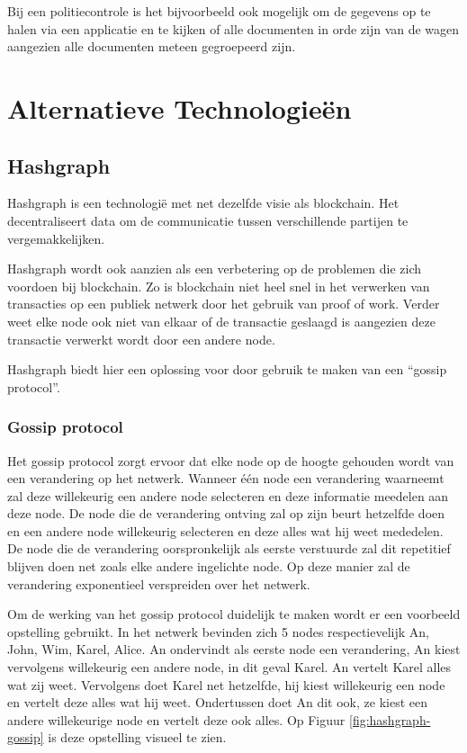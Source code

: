 Bij een politiecontrole is het bijvoorbeeld ook mogelijk om de gegevens op te halen via een applicatie en te kijken of alle documenten in orde zijn van de wagen aangezien alle documenten meteen gegroepeerd zijn. 

\chapter{Alternatieve Technologieën}
\label{ch:alternative-technology}

\section{Hashgraph}
Hashgraph is een technologië met net dezelfde visie als blockchain. Het decentraliseert data om de communicatie tussen verschillende partijen te vergemakkelijken. 

Hashgraph wordt ook aanzien als een verbetering op de problemen die zich voordoen bij blockchain. Zo is blockchain niet heel snel in het verwerken van transacties op een publiek netwerk door het gebruik van proof of work. Verder weet elke node ook niet van elkaar of de transactie geslaagd is aangezien deze transactie verwerkt wordt door een andere node. 

Hashgraph biedt hier een oplossing voor door gebruik te maken van een ``gossip protocol''.

\subsection{Gossip protocol}
Het gossip protocol zorgt ervoor dat elke node op de hoogte gehouden wordt van een verandering op het netwerk. Wanneer één node een verandering waarneemt zal deze willekeurig een andere node selecteren en deze informatie meedelen aan deze node. De node die de verandering ontving zal op zijn beurt hetzelfde doen en een andere node willekeurig selecteren en deze alles wat hij weet mededelen. De node die de verandering oorspronkelijk als eerste verstuurde zal dit repetitief blijven doen net zoals elke andere ingelichte node. Op deze manier zal de verandering exponentieel verspreiden over het netwerk.

Om de werking van het gossip protocol duidelijk te maken wordt er een voorbeeld opstelling gebruikt. In het netwerk bevinden zich 5 nodes respectievelijk An, John, Wim, Karel, Alice.
An ondervindt als eerste node een verandering, An kiest vervolgens willekeurig een andere node, in dit geval Karel. An vertelt Karel alles wat zij weet. Vervolgens doet Karel net hetzelfde, hij kiest willekeurig een node en vertelt deze alles wat hij weet. Ondertussen doet An dit ook, ze kiest een andere willekeurige node en vertelt deze ook alles. Op Figuur \ref{fig:hashgraph-gossip} is deze opstelling visueel te zien.

